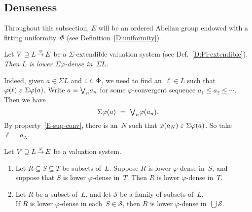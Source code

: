 \documentclass[main.tex]{subfiles}
\begin{document}
\subsection{Denseness}
\label{SS:dense}
Throughout this subsection,
$E$ will be an ordered Abelian group
endowed with a fitting uniformity~$\Phi$
(see Definition~\ref{D:uniformity}).
%
%
\begin{ex}
\label{E:sigma-dense}
Let $V \supseteq L\,\smash{\stackrel{\varphi}{\rightarrow}}\,E$
be a $\Sigma$-extendible valuation system
(see Def.~\ref{D:Pi-extendible}).
\emph{Then $L$ is lower $\Sigma\varphi$-dense in~$\Sigma L$.}

Indeed,
given $a\in \Sigma L$
and $\varepsilon \in \Phi$,
we need to find an~$\ell\in L$ 
such that $\varphi(\ell) \ \ve\ \Sigma\varphi(a)$.
Write $a=\textstyle{\bigvee}_n a_n$ for
some $\varphi$-convergent sequence $a_1 \leq a_2 \leq \dotsb$.
Then we have
\begin{equation*}
\Sigma\varphi(a)\ =\ \textstyle{\bigvee}_n \varphi(a_n).
\end{equation*}
By property~\ref{E-sup-conv},
there is an~$N$ such that $\varphi(a_N) \ \ve\ \Sigma\varphi(a)$.
So take $\ell =a_N$.
\end{ex}
%
%
\begin{lem}
\label{L:ldense-prop}
Let $V \supseteq L\,\smash{\stackrel{\varphi}{\rightarrow}}\,E$ be a valuation system.
\begin{enumerate}
\item
\label{L:ldense-prop-1}
Let $R\subseteq S\subseteq T$ be subsets of~$L$.
Suppose $R$ is lower $\varphi$-dense in~$S$,
and suppose that $S$ is lower $\varphi$-dense in~$T$.
Then $R$ is lower $\varphi$-dense in~$T$.

\item
\label{L:ldense-prop-2}
Let $R$ be a subset of~$L$,
and let $\mathcal S$ be a family of subsets of~$L$.\\
If $R$ is lower $\varphi$-dense in each~$S\in \mathcal{S}$,
then $R$ is lower $\varphi$-dense in~$\bigcup \mathcal{S}$.
\end{enumerate}
\end{lem}
\end{document}
